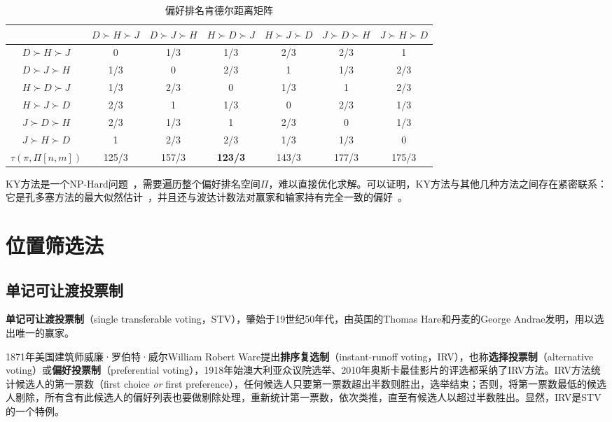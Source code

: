 \begin{example}
\begin{table}[ht]
    \label{tbl:preferencescore}
    \vspace{0.2cm}
    \begin{minipage}[t]{0.98\linewidth}
    \centering
    \begin{tabular}{c|cccccc}
      \hline
      & \small{$D\succ H\succ J$} & \small{$D\succ J\succ H$} & \small{$H\succ D\succ J$} & \small{$H\succ J\succ D$} & \small{$J\succ D\succ H$} & \small{$J\succ H\succ D$}\\
      \hline
      \small{$D\succ H\succ J$} & 0 & 1/3 & 1/3 & 2/3 & 2/3 & 1\\
      \small{$D\succ J\succ H$} & 1/3 & 0 & 2/3 & 1 & 1/3 & 2/3\\
      \small{$H\succ D\succ J$} & 1/3 & 2/3 & 0 & 1/3 & 1 & 2/3\\
      \small{$H\succ J\succ D$} & 2/3 & 1 & 1/3 & 0 & 2/3 & 1/3\\
      \small{$J\succ D\succ H$} & 2/3 & 1/3 & 1 & 2/3 & 0 & 1/3\\
      \small{$J\succ H\succ D$} & 1 & 2/3 & 2/3 & 1/3 & 1/3 & 0\\
      \hline
      $\tau(\pi,\Pi[n,m])$ & 125/3 & 157/3 & \textbf{123/3} & 143/3 & 177/3 & 175/3\\
      \hline
    \end{tabular}
    \end{minipage}
    \caption{偏好排名肯德尔距离矩阵}
    \label{tbl:preferencedistancematrix}
\end{table}
\end{example}

KY方法是一个NP-Hard问题~\cite{bartholdi1989voting}，需要遍历整个偏好排名空间$\Pi$，难以直接优化求解。可以证明，KY方法与其他几种方法之间存在紧密联系：它是孔多塞方法的最大似然估计~\cite{young1995optimal}，并且还与波达计数法对赢家和输家持有完全一致的偏好~\cite{saari2000geometric}。

\section{位置筛选法}
\subsection{单记可让渡投票制}
\textbf{单记可让渡投票制}（single transferable voting，STV），肇始于19世纪50年代，由英国的Thomas Hare和丹麦的George Andrae发明，用以选出唯一的赢家。

1871年美国建筑师威廉·罗伯特·威尔William Robert Ware提出\textbf{排序复选制}（instant-runoff voting，IRV），也称\textbf{选择投票制}（alternative voting）或\textbf{偏好投票制}（preferential voting），1918年始澳大利亚众议院选举、2010年奥斯卡最佳影片的评选都采纳了IRV方法。IRV方法统计候选人的第一票数（first choice \textit{or} first preference），任何候选人只要第一票数超出半数则胜出，选举结束；否则，将第一票数最低的候选人剔除，所有含有此候选人的偏好列表也要做剔除处理，重新统计第一票数，依次类推，直至有候选人以超过半数胜出。显然，IRV是STV的一个特例。

